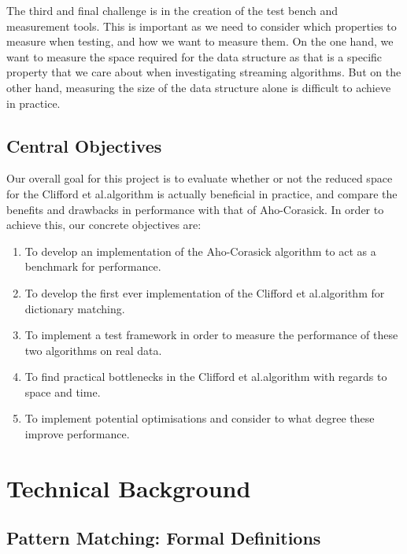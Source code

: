 \documentclass[ %
                    author={Dominic Joseph Moylett},
                    degree={MEng},
                     title={Dictionary Matching with Fingerprints},
                  subtitle={An Empirical Analysis},
                      type={research},
                      year={2015} ]{dissertation}
\begin{document}
The third and final challenge is in the creation of the test bench and measurement tools. This is important as we need to consider which properties to measure when testing, and how we want to measure them. On the one hand, we want to measure the space required for the data structure as that is a specific property that we care about when investigating streaming algorithms. But on the other hand, measuring the size of the data structure alone is difficult to achieve in practice.

\section{Central Objectives}
\label{sec:objectives}

Our overall goal for this project is to evaluate whether or not the reduced space for the Clifford et al.\@ algorithm is actually beneficial in practice, and compare the benefits and drawbacks in performance with that of Aho-Corasick. In order to achieve this, our concrete objectives are:

\begin{enumerate}
  \item To develop an implementation of the Aho-Corasick algorithm to act as a benchmark for performance.
  \item To develop the first ever implementation of the Clifford et al.\@ algorithm for dictionary matching.
  \item To implement a test framework in order to measure the performance of these two algorithms on real data.
  \item To find practical bottlenecks in the Clifford et al.\@ algorithm with regards to space and time.
  \item To implement potential optimisations and consider to what degree these improve performance.
\end{enumerate}


\chapter{Technical Background}
\label{chap:technical}

\section{Pattern Matching: Formal Definitions}
\end{document}
